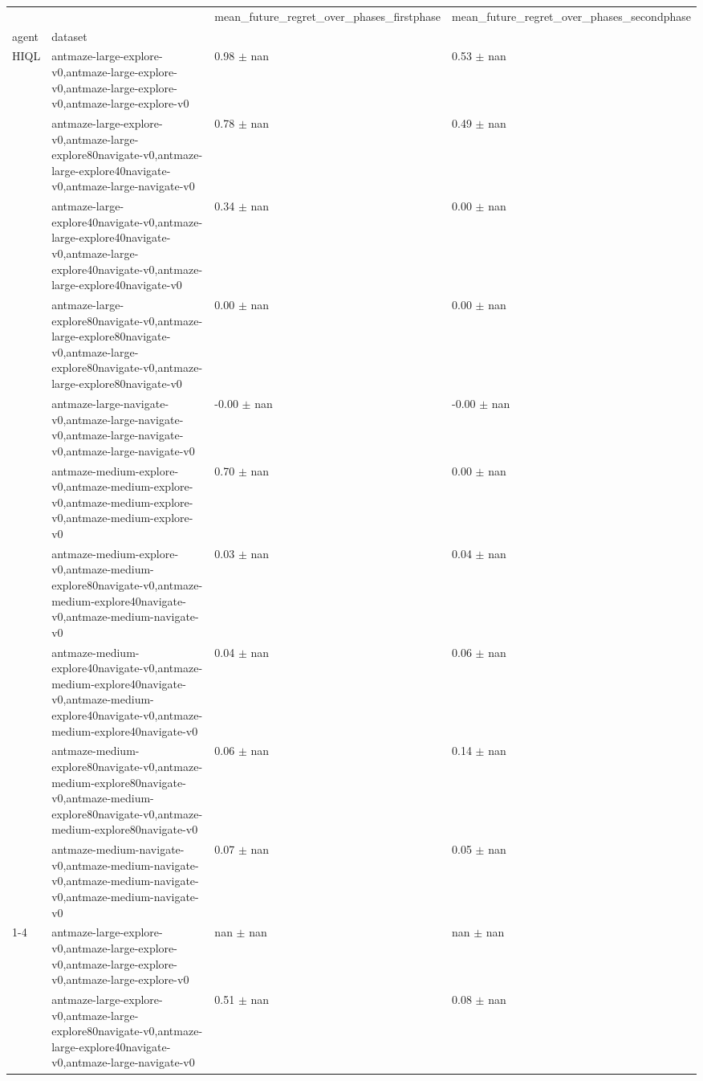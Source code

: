 \begin{tabular}{llll}
\toprule
 &  & mean_future_regret_over_phases_firstphase & mean_future_regret_over_phases_secondphase \\
agent & dataset &  &  \\
\midrule
\multirow[t]{10}{*}{HIQL} & antmaze-large-explore-v0,antmaze-large-explore-v0,antmaze-large-explore-v0,antmaze-large-explore-v0 & 0.98 $\pm$ nan & 0.53 $\pm$ nan \\
 & antmaze-large-explore-v0,antmaze-large-explore80navigate-v0,antmaze-large-explore40navigate-v0,antmaze-large-navigate-v0 & 0.78 $\pm$ nan & 0.49 $\pm$ nan \\
 & antmaze-large-explore40navigate-v0,antmaze-large-explore40navigate-v0,antmaze-large-explore40navigate-v0,antmaze-large-explore40navigate-v0 & 0.34 $\pm$ nan & 0.00 $\pm$ nan \\
 & antmaze-large-explore80navigate-v0,antmaze-large-explore80navigate-v0,antmaze-large-explore80navigate-v0,antmaze-large-explore80navigate-v0 & 0.00 $\pm$ nan & 0.00 $\pm$ nan \\
 & antmaze-large-navigate-v0,antmaze-large-navigate-v0,antmaze-large-navigate-v0,antmaze-large-navigate-v0 & -0.00 $\pm$ nan & -0.00 $\pm$ nan \\
 & antmaze-medium-explore-v0,antmaze-medium-explore-v0,antmaze-medium-explore-v0,antmaze-medium-explore-v0 & 0.70 $\pm$ nan & 0.00 $\pm$ nan \\
 & antmaze-medium-explore-v0,antmaze-medium-explore80navigate-v0,antmaze-medium-explore40navigate-v0,antmaze-medium-navigate-v0 & 0.03 $\pm$ nan & 0.04 $\pm$ nan \\
 & antmaze-medium-explore40navigate-v0,antmaze-medium-explore40navigate-v0,antmaze-medium-explore40navigate-v0,antmaze-medium-explore40navigate-v0 & 0.04 $\pm$ nan & 0.06 $\pm$ nan \\
 & antmaze-medium-explore80navigate-v0,antmaze-medium-explore80navigate-v0,antmaze-medium-explore80navigate-v0,antmaze-medium-explore80navigate-v0 & 0.06 $\pm$ nan & 0.14 $\pm$ nan \\
 & antmaze-medium-navigate-v0,antmaze-medium-navigate-v0,antmaze-medium-navigate-v0,antmaze-medium-navigate-v0 & 0.07 $\pm$ nan & 0.05 $\pm$ nan \\
\cline{1-4}
\multirow[t]{10}{*}{QRL} & antmaze-large-explore-v0,antmaze-large-explore-v0,antmaze-large-explore-v0,antmaze-large-explore-v0 & nan $\pm$ nan & nan $\pm$ nan \\
 & antmaze-large-explore-v0,antmaze-large-explore80navigate-v0,antmaze-large-explore40navigate-v0,antmaze-large-navigate-v0 & 0.51 $\pm$ nan & 0.08 $\pm$ nan \\

\end{tabular}
